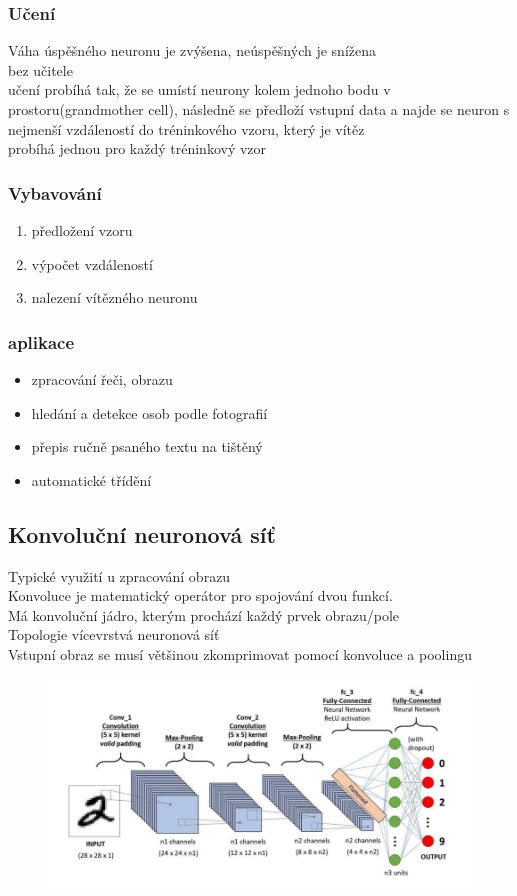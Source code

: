\subsubsection*{Učení}
Váha úspěšného neuronu je zvýšena, neúspěšných je snížena\\
bez učitele\\
učení probíhá tak, že se umístí neurony kolem jednoho bodu v prostoru(grandmother cell), následně se předloží vstupní data a najde se neuron s nejmenší vzdáleností do tréninkového vzoru, který je vítěz\\
probíhá jednou pro každý tréninkový vzor\\

\subsubsection*{Vybavování}
\begin{enumerate}
    \item předložení vzoru
    \item výpočet vzdáleností
    \item nalezení vítězného neuronu
\end{enumerate}

\subsubsection*{aplikace}
\begin{itemize}
    \item zpracování řeči, obrazu
    \item hledání a detekce osob podle fotografií
    \item přepis ručně psaného textu na tištěný
    \item automatické třídění 
\end{itemize}
\newpage
\subsection*{Konvoluční neuronová síť}
Typické využití u zpracování obrazu\\
Konvoluce je matematický operátor pro spojování dvou funkcí.\\
Má konvoluční jádro, kterým prochází každý prvek obrazu/pole\\
Topologie vícevrstvá neuronová síť\\
Vstupní obraz se musí většinou zkomprimovat pomocí konvoluce a poolingu\\

\begin{figure}[H]
    \includegraphics[scale = 1]{images/konvoluce.png}    
\end{figure}